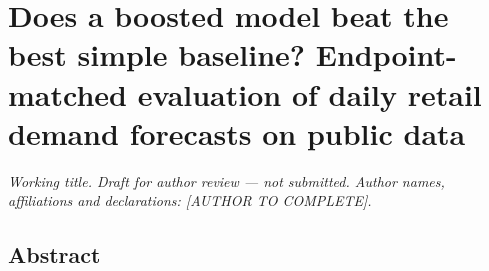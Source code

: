 \documentclass[
]{article}
\author{}
\date{}
\begin{document}
\section{Does a boosted model beat the best simple baseline?
Endpoint-matched evaluation of daily retail demand forecasts on public
data}\label{does-a-boosted-model-beat-the-best-simple-baseline-endpoint-matched-evaluation-of-daily-retail-demand-forecasts-on-public-data}

\emph{Working title. Draft for author review --- not submitted. Author
names, affiliations and declarations: {[}AUTHOR TO COMPLETE{]}.}

\subsection{Abstract}\label{abstract}
\end{document}
